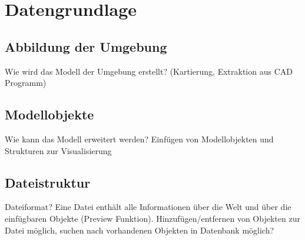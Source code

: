 \chapter{Datengrundlage}
\label{chap:datengrundlage}

\section{Abbildung der Umgebung}
Wie wird das Modell der Umgebung erstellt? (Kartierung, Extraktion aus CAD Programm)\\

\section{Modellobjekte}
Wie kann das Modell erweitert werden? Einfügen von Modellobjekten und Strukturen zur Visualisierung\\

\section{Dateistruktur}
Dateiformat? Eine Datei enthält alle Informationen über die Welt und über die einfügbaren Objekte (Preview Funktion). Hinzufügen/entfernen von Objekten zur Datei möglich, suchen nach vorhandenen Objekten in Datenbank möglich?



